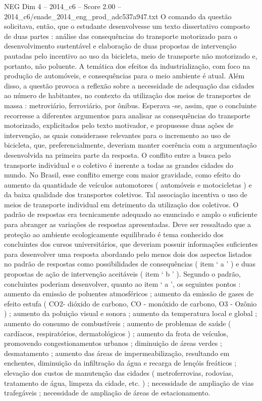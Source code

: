 \begin{textsample}{NEG Dim 4 – 2014\_c6 – Score 2.00 – 2014\_c6/enade\_2014\_eng\_prod\_adc537a947.txt}
O comando da questão solicitava, então, que o estudante desenvolvesse um texto dissertativo composto de duas partes : análise das consequências do transporte motorizado para o desenvolvimento sustentável e elaboração de duas propostas de intervenção pautadas pelo incentivo ao uso da bicicleta, meio de transporte não motorizado e, portanto, não poluente.
A temática dos efeitos da industrialização, com foco na produção de automóveis, e consequências para o meio ambiente é atual.
Além disso, a questão provoca a reflexão sobre a necessidade de adequação das cidades ao número de habitantes, no contexto da utilização dos meios de transportes de massa : metroviário, ferroviário, por ônibus.
Esperava -se, assim, que o concluinte recorresse a diferentes argumentos para analisar as consequências do transporte motorizado, explicitados pelo texto motivador, e propusesse duas ações de intervenção, as quais considerasse relevantes para o incremento ao uso de bicicleta, que, preferencialmente, deveriam manter coerência com a argumentação desenvolvida na primeira parte da resposta.
O conflito entre a busca pelo transporte individual e o coletivo é inerente a todas as grandes cidades do mundo.
No Brasil, esse conflito emerge com maior gravidade, como efeito do aumento da quantidade de veículos automotores ( automóveis e motocicletas ) e da baixa qualidade dos transportes coletivos.
Tal associação incentiva o uso de meios de transporte individual em detrimento da utilização dos coletivos.
O padrão de respostas era tecnicamente adequado ao enunciado e amplo o suficiente para abranger as variações de respostas apresentadas.
Deve ser ressaltado que a proteção ao ambiente ecologicamente equilibrado é tema conhecido dos concluintes dos cursos universitários, que deveriam possuir informações suficientes para desenvolver uma resposta abordando pelo menos dois dos aspectos listados no padrão de respostas como possibilidades de consequências ( item ‘ a ’ ) e duas propostas de ação de intervenção aceitáveis ( item ‘ b ’ ).
Segundo o padrão, concluintes poderiam desenvolver, quanto ao item ‘ a ’, os seguintes pontos : aumento da emissão de poluentes atmosféricos ; aumento da emissão de gases de efeito estufa ( CO2- dióxido de carbono, CO - monóxido de carbono, O3 - Ozônio ) ; aumento da poluição visual e sonora ; aumento da temperatura local e global ; aumento do consumo de combustíveis ; aumento de problemas de saúde ( cardíacos, respiratórios, dermatológicos ) ; aumento da frota de veículos, promovendo congestionamentos urbanos ; diminuição de áreas verdes ; desmatamento ; aumento das áreas de impermeabilização, resultando em enchentes, diminuição da infiltração da água e recarga de lençóis freáticos ; elevação dos custos de manutenção das cidades ( metroferrovias, rodovias, tratamento de água, limpeza da cidade, etc. ) ; necessidade de ampliação de vias trafegáveis ; necessidade de ampliação de áreas de estacionamento.

\end{textsample}
